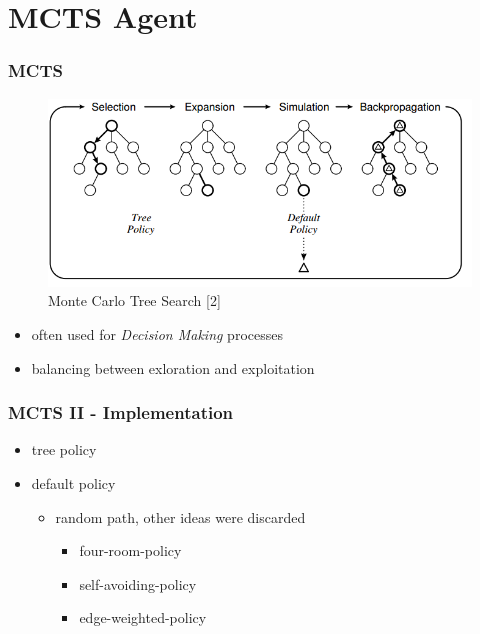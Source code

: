 \documentclass{beamer}
\begin{document}
\section{MCTS Agent}

\begin{frame}
\frametitle{MCTS}

\begin{figure}
\includegraphics[scale=0.35]{img/mcts_structure.png}
\caption{Monte Carlo Tree Search [2]}
\label{fig:mcts_struc}
\end{figure}

\begin{itemize}
 \item often used for \textit{Decision Making} processes
 \item balancing between exloration and exploitation
\end{itemize}

\end{frame}

\begin{frame}
\frametitle{MCTS II - Implementation}
\begin{itemize}
 \item tree policy
 	\item default policy
 	\begin{itemize}
 		\item random path, other ideas were discarded
 		\begin{itemize}
 			\item four-room-policy
 			\item self-avoiding-policy
 			\item edge-weighted-policy
 		\end{itemize}
 	\end{itemize}

 \end{itemize}

\end{frame}
\end{document}
